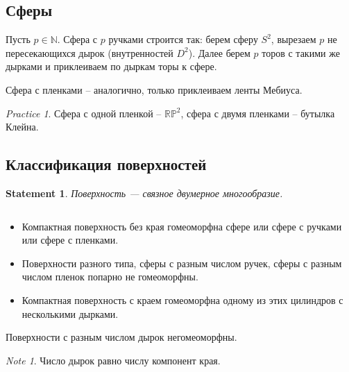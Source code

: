 \documentclass[11pt]{book}
\newcommand{\N}{\mathbb{N}}
\newcommand{\R}{\mathbb{R}}
\newcommand{\Pm}{\mathbb{P}}
\theoremstyle{definition}
\theoremstyle{plain}
\theoremstyle{plain}
\newtheorem*{st}{Statement}
\theoremstyle{definition}
\theoremstyle{remark}
\newtheorem*{note}{Note}
\newtheorem*{prac}{Practice}
\begin{document}
\subsection{Сферы}
\begin{defn}
    Пусть $ p \in  \N$. Сфера с $ p$  ручками строится так:
    берем сферу  $ S^{2}$, вырезаем $ p$ не пересекающихся дырок (внутренностей $ D^{2}$). Далее берем $ p$ торов с такими же дырками и приклеиваем по дыркам торы к сфере.
\end{defn}
\begin{defn}
    Сфера с пленками -- аналогично, только приклеиваем ленты Мебиуса.
\end{defn}
\begin{prac}
    Сфера с одной пленкой -- $ \R \Pm^{2}$, сфера с двумя пленками -- бутылка Клейна.
\end{prac}
\subsection{Классификация поверхностей}
\begin{st}
    Поверхность --- связное двумерное многообразие.
\end{st}
\begin{thm}
    $ $
    \begin{itemize}
	\item Компактная поверхность без края гомеоморфна сфере или сфере с ручками или сфере с пленками.
	\item Поверхности разного типа, сферы с разным числом ручек, сферы с разным числом пленок попарно не гомеоморфны.
	\item Компактная поверхность с краем гомеоморфна одному из этих цилиндров с несколькими дырками.
    \end{itemize}
    Поверхности с разным числом дырок негомеоморфны.
\end{thm}
\begin{note}
    Число дырок равно числу компонент края.
\end{note}
\end{document}
